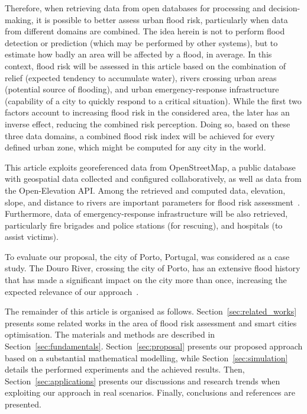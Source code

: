 \begin{refsection}
Therefore, when retrieving data from open databases for processing and decision-making, it is possible to better assess urban flood risk, particularly when data from different domains are combined. The idea herein is not to perform flood detection or prediction (which may be performed by other systems), but to estimate how badly an area will be affected by a flood, in average. In this context, flood risk will be assessed in this article based on the combination of relief (expected tendency to accumulate water), rivers crossing urban areas (potential source of flooding), and urban emergency-response infrastructure (capability of a city to quickly respond to a critical situation). While the first two factors account to increasing flood risk in the considered area, the later has an inverse effect, reducing the combined risk perception. Doing so, based on these three data domains, a combined flood risk index will be achieved for every defined urban zone, which might be computed for any city in the world.

This article exploits georeferenced data from OpenStreetMap, a public database with geospatial data collected and configured collaboratively, as well as data from the Open-Elevation API. Among the retrieved and computed data, elevation, slope, and distance to rivers are important parameters for flood risk assessment~\cite{elevation1}. Furthermore, data of emergency-response infrastructure will be also retrieved, particularly fire brigades and police stations (for rescuing), and hospitals (to assist victims). 

To evaluate our proposal, the city of Porto, Portugal, was considered as a case study. The Douro River, crossing the city of Porto, has an extensive flood history that has made a significant impact on the city more than once, increasing the expected relevance of our approach~\cite{dourohistory}. 

The remainder of this article is organised as follows. Section~\ref{sec:related_works} presents some related works in the area of flood risk assessment and smart cities optimisation. The materials and methods are described in Section~\ref{sec:fundamentals}. Section~\ref{sec:proposal} presents our proposed approach based on a substantial mathematical modelling, while Section~\ref{sec:simulation} details the performed experiments and the achieved results. Then, Section~\ref{sec:applications} presents our discussions and research trends when exploiting our approach in real scenarios. Finally, conclusions and references are presented.


\end{refsection}
